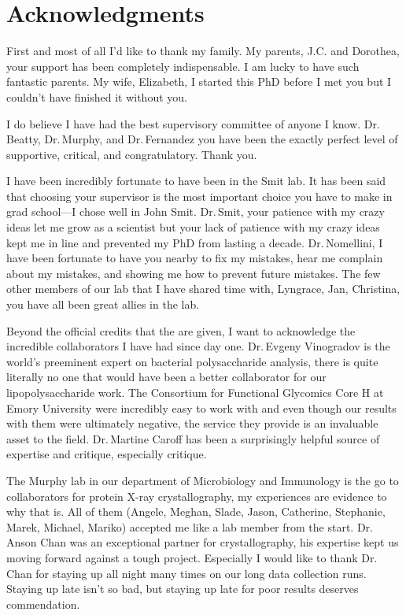 
\chapter{Acknowledgments}

First and most of all I'd like to thank my family. My parents, J.C. and Dorothea, your support has been completely indispensable. I am lucky to have such fantastic parents. My wife, Elizabeth, I started this PhD before I met you but I couldn't have finished it without you. 

I do believe I have had the best supervisory committee of anyone I know. Dr.\,Beatty, Dr.\,Murphy, and  Dr.\,Fernandez you have been the exactly perfect level of supportive, critical, and congratulatory. Thank you.

I have been incredibly fortunate to have been in the Smit lab. It has been said that choosing your supervisor is the most important choice you have to make in grad school---I chose well in John Smit. Dr.\,Smit, your patience with my crazy ideas let me grow as a scientist but your lack of patience with my crazy ideas kept me in line and prevented my PhD from lasting a decade. Dr.\,Nomellini, I have been fortunate to have you nearby to fix my mistakes, hear me complain about my mistakes, and showing me how to prevent future mistakes. The few other members of our lab that I have shared time with, Lyngrace, Jan, Christina, you have all been great allies in the lab.

Beyond the official credits that the are given, I want to acknowledge the incredible collaborators I have had since day one. 
Dr.\,Evgeny Vinogradov is the world's preeminent expert on bacterial polysaccharide analysis, there is quite literally no one that would have been a better collaborator for our lipopolysaccharide work. The Consortium for Functional Glycomics Core H at Emory University were incredibly easy to work with and even though our results with them were ultimately negative, the service they provide is an invaluable asset to the field. Dr.\,Martine Caroff has been a surprisingly helpful source of expertise and critique, especially critique.

The Murphy lab in our department of Microbiology and Immunology is the go to collaborators for protein X-ray crystallography, my experiences are evidence to why that is. All of them (Angele, Meghan, Slade, Jason, Catherine, Stephanie, Marek, Michael, Mariko) accepted me like a lab member from the start. Dr.\,Anson Chan was an exceptional partner for crystallography, his expertise kept us moving forward against a tough project. Especially I would like to thank Dr.\,Chan for staying up all night many times on our long data collection runs. Staying up late isn't so bad, but staying up late for poor results deserves commendation. 


